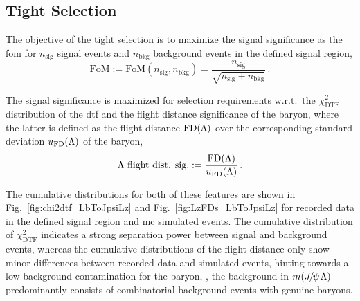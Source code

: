 
\subsection{Tight Selection}
The objective of the tight selection is to maximize the signal significance as the \gls{fom} for $n_\text{sig}$ signal events and $n_\text{bkg}$ background events in the defined signal region,
\begin{equation}
    \label{eq:fom_LbToJpsiLz}
    \mathrm{FoM} := \mathrm{FoM}(n_\text{sig}, n_\text{bkg}) = \frac{n_\text{sig}}{\sqrt{n_\text{sig} + n_\text{bkg}}} \,.
\end{equation}

The signal significance is maximized for selection requirements w.r.t.\ the $\chi^2_\text{DTF}$ distribution of the \gls{dtf} and the flight distance significance of the \Lz baryon, where the latter is defined as the flight distance $\mathrm{FD}({\Lambda})$ over the corresponding standard deviation $u_\mathrm{FD}({\Lambda})$ of the \Lz baryon,
\begin{equation*}
    \text{\Lz flight dist. sig.} := \frac{\mathrm{FD}(\Lz)}{u_\mathrm{FD}(\Lz)} \,.
\end{equation*}

The cumulative distributions for both of these features are shown in Fig.~\ref{fig:chi2dtf_LbToJpsiLz} and Fig.~\ref{fig:LzFDs_LbToJpsiLz} for recorded data in the defined signal region and \gls{mc} simulated events.
The cumulative distribution of $\chi^2_\text{DTF}$ indicates a strong separation power between signal and background events, whereas the cumulative distributions of the \Lz flight distance only show minor differences between recorded data and simulated events, hinting towards a low background contamination for the \Lz baryon, \ie{}, the background in $m({{J\mskip -3mu/\mskip -2mu\psi\mskip 2mu}}{\Lambda})$ predominantly consists of combinatorial background events with genuine \Lz baryons.

